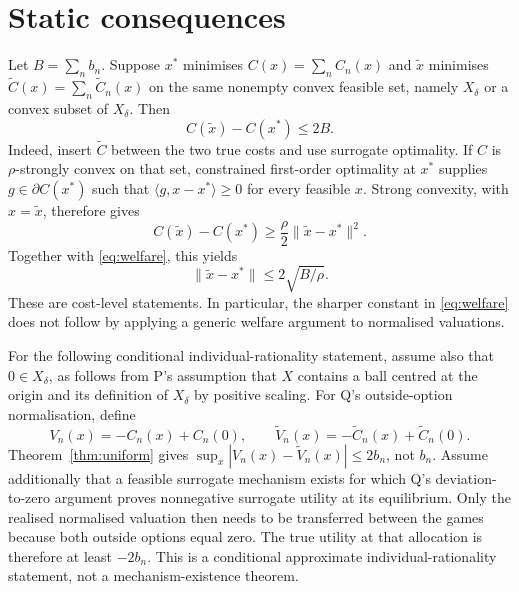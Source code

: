 \documentclass{article}
\begin{document}
\section{Static consequences}

Let $B=\sum_n b_n$.  Suppose $x^*$ minimises
$C(x)=\sum_nC_n(x)$ and $\widetilde x$ minimises
$\widetilde C(x)=\sum_n\widetilde C_n(x)$ on the same nonempty convex feasible
set, namely $X_\delta$ or a convex subset of $X_\delta$.  Then
\begin{equation}\label{eq:welfare}
 C(\widetilde x)-C(x^*)\leq 2B.
\end{equation}
Indeed, insert $\widetilde C$ between the two true costs and use surrogate optimality.  %
If $C$ is $\rho$-strongly convex on that set, constrained first-order
optimality at $x^*$ supplies $g\in\partial C(x^*)$ such that
$\langle g,x-x^*\rangle\geq0$ for every feasible $x$.  Strong convexity,
with $x=\widetilde x$, therefore gives
\[
 C(\widetilde x)-C(x^*)\geq
 \frac{\rho}{2}\|\widetilde x-x^*\|^2.
\]
Together with \eqref{eq:welfare}, this yields
\begin{equation}\label{eq:allocation}
 \|\widetilde x-x^*\|\leq 2\sqrt{B/\rho}.
\end{equation}
These are cost-level statements.  In particular, the sharper constant in \eqref{eq:welfare} does not follow by applying a generic welfare argument to normalised valuations.  %

For the following conditional individual-rationality statement, assume also
that $0\in X_\delta$, as follows from P's assumption that $X$ contains a ball
centred at the origin and its definition of $X_\delta$ by positive scaling.
For Q's outside-option normalisation, define
\[
 V_n(x)=-C_n(x)+C_n(0),\qquad
 \widetilde V_n(x)=-\widetilde C_n(x)+\widetilde C_n(0).
\]
Theorem~\ref{thm:uniform} gives
$\sup_x|V_n(x)-\widetilde V_n(x)|\leq2b_n$, not $b_n$.  %
Assume additionally that a feasible surrogate mechanism exists for which Q's deviation-to-zero argument proves nonnegative surrogate utility at its equilibrium.  Only the realised normalised valuation then needs to be transferred between the games because both outside options equal zero.  The true utility at that allocation is therefore at least $-2b_n$.  %
This is a conditional approximate individual-rationality statement, not a mechanism-existence theorem.  %
\end{document}
